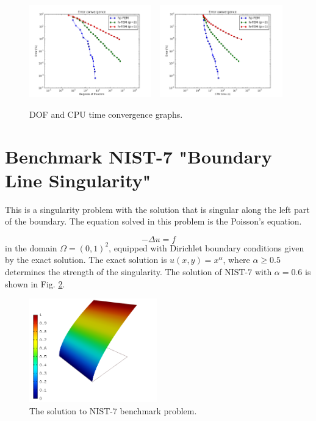 \documentclass[12pt]{elsarticle}
\begin{document}
\begin{figure}[H]
\centering
\includegraphics[height=4cm]{nist/nist-6/conv_dof_aniso.png}\ \
\includegraphics[height=4cm]{nist/nist-6/conv_cpu_aniso.png}
\caption{DOF and CPU time convergence graphs.}
\vspace{-5mm}
\label{fig:nist-6-conv}
\end{figure}


\section{Benchmark NIST-7 "Boundary Line Singularity"}
\label{sec:bench-7}

This is a singularity problem with the solution that is singular along the left part of the boundary.
The equation solved in this problem is the Poisson's equation.

\begin{equation} \label{boundary-line-singularity}
-\Delta u = f
\end{equation}
in the domain $\Omega = (0, 1)^2$, equipped with Dirichlet boundary conditions
given by the exact solution. The exact solution is
$u(x,y) = x^{\alpha}$,
where $\alpha \geq 0.5$ determines the strength of the singularity.
The solution of NIST-7 with $\alpha = 0.6$ is shown in Fig. \ref{fig:sln-nist07}.

\begin{figure}[H]
\centering
\vspace{-3mm}
\includegraphics[height=4.5cm]{nist/nist-7/solution.png}
\caption{The solution to NIST-7 benchmark problem.}
\label{fig:sln-nist07}
\end{figure}
\end{document}
